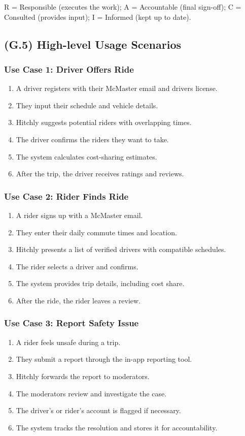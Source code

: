 \documentclass[12pt,letterpaper]{article}
\begin{document}
 R = Responsible (executes the work); A = Accountable (final sign-off); C = Consulted (provides input); I = Informed (kept up to date).

\subsection{(G.5) High-level Usage Scenarios}

\subsubsection*{Use Case 1: Driver Offers Ride}
\begin{enumerate}
    \item A driver registers with their McMaster email and drivers license.
    \item They input their schedule and vehicle details.
    \item Hitchly suggests potential riders with overlapping times.
    \item The driver confirms the riders they want to take.
    \item The system calculates cost-sharing estimates.
    \item After the trip, the driver receives ratings and reviews.
\end{enumerate}

\subsubsection*{Use Case 2: Rider Finds Ride}
\begin{enumerate}
    \item A rider signs up with a McMaster email.
    \item They enter their daily commute times and location.
    \item Hitchly presents a list of verified drivers with compatible schedules.
    \item The rider selects a driver and confirms.
    \item The system provides trip details, including cost share.
    \item After the ride, the rider leaves a review.
\end{enumerate}

\subsubsection*{Use Case 3: Report Safety Issue}
\begin{enumerate}
    \item A rider feels unsafe during a trip.
    \item They submit a report through the in-app reporting tool.
    \item Hitchly forwards the report to moderators.
    \item The moderators review and investigate the case.
    \item The driver’s or rider’s account is flagged if necessary.
    \item The system tracks the resolution and stores it for accountability.
\end{enumerate}
\end{document}
